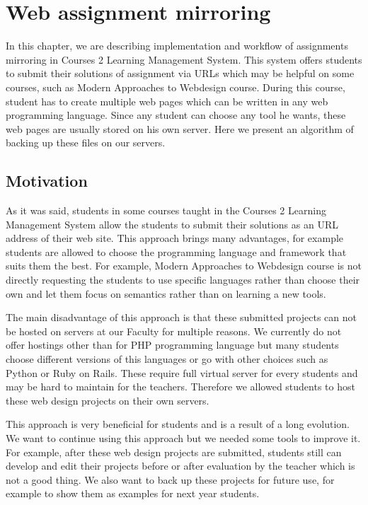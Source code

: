 \chapter{Web assignment mirroring}

In this chapter, we are describing implementation and workflow of assignments mirroring in Courses 2 Learning Management System. This system offers students to submit their solutions of assignment via URLs which may be helpful on some courses, such as Modern Approaches to Webdesign course. During this course, student has to create multiple web pages which can be written in any web programming language. Since any student can choose any tool he wants, these web pages are usually stored on his own server. Here we present an algorithm of backing up these files on our servers.

\section{Motivation}
As it was said, students in some courses taught in the Courses 2 Learning Management System allow the students to submit their solutions as an URL address of their web site. This approach brings many advantages, for example students are allowed to choose the programming language and framework that suits them the best. For example, Modern Approaches to Webdesign course is not directly requesting the students to use specific languages rather than choose their own and let them focus on semantics rather than on learning a new tools.

The main disadvantage of this approach is that these submitted projects can not be hosted on servers at our Faculty for multiple reasons. We currently do not offer hostings other than for PHP programming language but many students choose different versions of this languages or go with other choices such as Python or Ruby on Rails. These require full virtual server for every students and may be hard to maintain for the teachers. Therefore we allowed students to host these web design projects on their own servers.

This approach is very beneficial for students and is a result of a long evolution. We want to continue using this approach but we needed some tools to improve it. For example, after these web design projects are submitted, students still can develop and edit their projects before or after evaluation by the teacher which is not a good thing. We also want to back up these projects for future use, for example to show them as examples for next year students.

